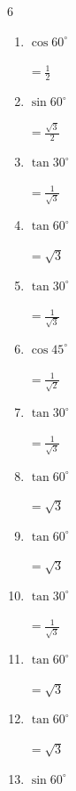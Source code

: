 \begin{multicols}{6}
\begin{enumerate}
        $\displaystyle =\frac{1}{\sqrt{2}}$

\columnbreak %

  \item $\displaystyle \cos{60^\circ}$

        $\displaystyle =\frac{1}{2}$

  \item $\displaystyle \sin{60^\circ}$

        $\displaystyle =\frac{\sqrt{3}}{2}$

  \item $\displaystyle \tan{30^\circ}$

        $\displaystyle =\frac{1}{\sqrt{3}}$

  \item $\displaystyle \tan{60^\circ}$

        $\displaystyle =\sqrt{3}$

  \item $\displaystyle \tan{30^\circ}$

        $\displaystyle =\frac{1}{\sqrt{3}}$

  \item $\displaystyle \cos{45^\circ}$

        $\displaystyle =\frac{1}{\sqrt{2}}$

  \item $\displaystyle \tan{30^\circ}$

        $\displaystyle =\frac{1}{\sqrt{3}}$

  \item $\displaystyle \tan{60^\circ}$

        $\displaystyle =\sqrt{3}$

  \item $\displaystyle \tan{60^\circ}$

        $\displaystyle =\sqrt{3}$

  \item $\displaystyle \tan{30^\circ}$

        $\displaystyle =\frac{1}{\sqrt{3}}$

  \item $\displaystyle \tan{60^\circ}$

        $\displaystyle =\sqrt{3}$

  \item $\displaystyle \tan{60^\circ}$

        $\displaystyle =\sqrt{3}$

  \item $\displaystyle \sin{60^\circ}$


\end{enumerate}
\end{multicols}
